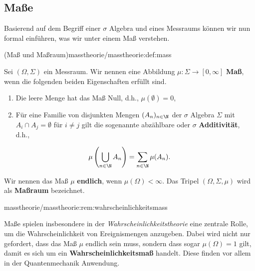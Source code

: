 \documentclass[letterpaper,10pt,german]{jupyterBook}
\begin{document}
\subsection{Maße}
\label{\detokenize{masstheorie/masstheorie:masze}}
\par
Basierend auf dem Begriff einer \(\sigma\) Algebra und eines Messraums können wir nun formal einführen, was wir unter einem Maß verstehen.
\begin{definition}{(Maß und Maßraum)}{masstheorie/masstheorie:def:mass}



\par
Sei \((\Omega, \Sigma)\) ein Messraum.
Wir nennen eine Abbildung \(\mu: \Sigma\to [0, \infty]\) \textbf{Maß}, wenn die folgenden beiden Eigenschaften erfüllt sind.
\begin{enumerate}

\item {} 
\par
Die leere Menge hat das Maß Null, d.h., \(\mu(\emptyset) = 0\),

\item {} 
\par
Für eine Familie von disjunkten Mengen \((A_n)_{n\in\N}\) der \(\sigma\) Algebra \(\Sigma\) mit \(A_i \cap A_j = \emptyset\) für \(i \neq j\) gilt die sogenannte abzählbare oder \(\sigma\) \textbf{Additivität}, d.h.,

\end{enumerate}
\begin{align*}
\mu\left( \bigcup_{n\in\N}A_n \right) = \sum_{n\in\N}\mu (A_n).
\end{align*}
\par
Wir nennen das Maß \(\mu\) \textbf{endlich}, wenn \(\mu(\Omega)<\infty\).
Das Tripel \((\Omega, \Sigma, \mu)\) wird als \textbf{Maßraum} bezeichnet.
\end{definition}
\begin{remark}{}{masstheorie/masstheorie:rem:wahrscheinlichkeitsmass}



\par
Maße spielen insbesondere in der \emph{Wahrscheinlichkeitstheorie} eine zentrale Rolle, um die Wahrscheinlichkeit von Ereignismengen anzugeben.
Dabei wird nicht nur gefordert, dass das Maß \(\mu\) endlich sein muss, sondern dass sogar \(\mu(\Omega)=1\) gilt, damit es sich um ein \textbf{Wahrscheinlichkeitsmaß} handelt.
Diese finden vor allem in der Quantenmechanik Anwendung.
\end{remark}
\end{document}
